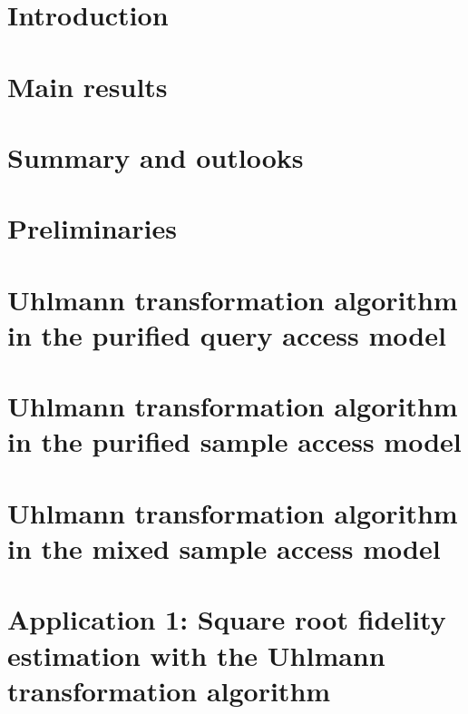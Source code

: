 \documentclass[superscriptaddress,11pt,bibliography]{article}
\theoremstyle{definition}
\theoremstyle{definition}
\begin{document}
\tableofcontents


\clearpage
\setcounter{page}{1}  
\pagestyle{plain}


\section{Introduction}
\label{sec:introduction}




\section{Main results}
\label{sec:mainresults}


\section{Summary and outlooks}
\label{sec:conclusion}





\section{Preliminaries}
\label{sec:preliminaries}



\section{Uhlmann transformation algorithm in the purified query access model}
\label{sec:purif query}

\section{Uhlmann transformation algorithm in the purified sample access model}
\label{sec:purif sample}

\section{Uhlmann transformation algorithm in the mixed sample access model}
\label{sec:mixed sample}



\section{Application 1: Square root fidelity estimation with the Uhlmann transformation algorithm}
\label{sec:application}

\end{document}
